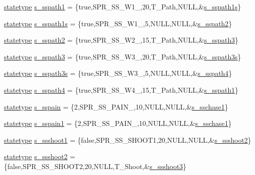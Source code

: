 \begin{DoxyCompactItemize}
\hyperlink{structstatestruct}{statetype} \hyperlink{WL__ACT2_8C_aa702a1b9c5c53d860c97f3c38641bd36}{s\_\-sspath1} = \{true,SPR\_\-SS\_\-W1\_,20,T\_\-Path,NULL,\&\hyperlink{WL__ACT2_8C_a424792f55732229257e143b530c4d9d0}{s\_\-sspath1s}\}
\item 
\hyperlink{structstatestruct}{statetype} \hyperlink{WL__ACT2_8C_a424792f55732229257e143b530c4d9d0}{s\_\-sspath1s} = \{true,SPR\_\-SS\_\-W1\_,5,NULL,NULL,\&\hyperlink{WL__ACT2_8C_a38a6aacff1eebdbaddc8bbaf9639231f}{s\_\-sspath2}\}
\item 
\hyperlink{structstatestruct}{statetype} \hyperlink{WL__ACT2_8C_a38a6aacff1eebdbaddc8bbaf9639231f}{s\_\-sspath2} = \{true,SPR\_\-SS\_\-W2\_,15,T\_\-Path,NULL,\&\hyperlink{WL__ACT2_8C_ad232b5fa4d37725d0cad265b0882032f}{s\_\-sspath3}\}
\item 
\hyperlink{structstatestruct}{statetype} \hyperlink{WL__ACT2_8C_ad232b5fa4d37725d0cad265b0882032f}{s\_\-sspath3} = \{true,SPR\_\-SS\_\-W3\_,20,T\_\-Path,NULL,\&\hyperlink{WL__ACT2_8C_aba1afc219ee599720058c7f2e6e65e7e}{s\_\-sspath3s}\}
\item 
\hyperlink{structstatestruct}{statetype} \hyperlink{WL__ACT2_8C_aba1afc219ee599720058c7f2e6e65e7e}{s\_\-sspath3s} = \{true,SPR\_\-SS\_\-W3\_,5,NULL,NULL,\&\hyperlink{WL__ACT2_8C_a8ff64b310cfc203d5f647fefbec4d417}{s\_\-sspath4}\}
\item 
\hyperlink{structstatestruct}{statetype} \hyperlink{WL__ACT2_8C_a8ff64b310cfc203d5f647fefbec4d417}{s\_\-sspath4} = \{true,SPR\_\-SS\_\-W4\_,15,T\_\-Path,NULL,\&\hyperlink{WL__ACT2_8C_aa702a1b9c5c53d860c97f3c38641bd36}{s\_\-sspath1}\}
\item 
\hyperlink{structstatestruct}{statetype} \hyperlink{WL__ACT2_8C_ab483f8908a6f7bdccb624e36aa194b10}{s\_\-sspain} = \{2,SPR\_\-SS\_\-PAIN\_,10,NULL,NULL,\&\hyperlink{WL__DEF_8H_ae0f8e756abc0877ae24d5fd8e3b88bea}{s\_\-sschase1}\}
\item 
\hyperlink{structstatestruct}{statetype} \hyperlink{WL__ACT2_8C_ae06c22cf4b2074ce1fb3225dfd84a54c}{s\_\-sspain1} = \{2,SPR\_\-SS\_\-PAIN\_,10,NULL,NULL,\&\hyperlink{WL__DEF_8H_ae0f8e756abc0877ae24d5fd8e3b88bea}{s\_\-sschase1}\}
\item 
\hyperlink{structstatestruct}{statetype} \hyperlink{WL__ACT2_8C_ab84ec28c4a3bedd5c47e7f52ff210dec}{s\_\-ssshoot1} = \{false,SPR\_\-SS\_\-SHOOT1,20,NULL,NULL,\&\hyperlink{WL__ACT2_8C_adefa962185ee8059a6de842d0fd2da10}{s\_\-ssshoot2}\}
\item 
\hyperlink{structstatestruct}{statetype} \hyperlink{WL__ACT2_8C_adefa962185ee8059a6de842d0fd2da10}{s\_\-ssshoot2} = \{false,SPR\_\-SS\_\-SHOOT2,20,NULL,T\_\-Shoot,\&\hyperlink{WL__ACT2_8C_ab375d6f13bacc2be512c19659bf7ba19}{s\_\-ssshoot3}\}

\end{DoxyCompactItemize}
